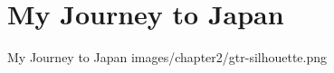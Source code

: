 \chapter{My Journey to Japan}

\ChapterOpening
    {My Journey to Japan}
    {images/chapter2/gtr-silhouette.png}







